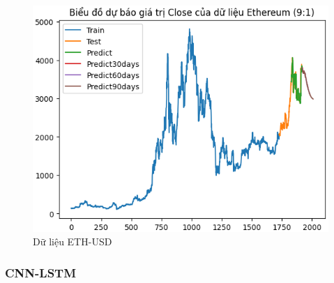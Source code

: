 \documentclass[conference]{IEEEtran}
\begin{document}
\begin{figure}[H]
\begin{minipage}{0.15\textwidth}
			\includegraphics[width=1\textwidth]{Figure/RNN_ETH91.png}
		\end{minipage}
		\caption{Dữ liệu ETH-USD}
		\label{fig:1}
	\end{figure}
	
	\subsubsection{CNN-LSTM}
	
\end{document}
